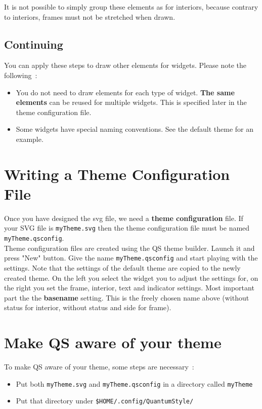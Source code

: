 \documentclass[a4paper,12pt]{report}
\begin{document}
It is not possible to simply group these elements as for interiors, because
contrary to interiors, frames must not be stretched when drawn.\\

\subsection{Continuing}
You can apply these steps to draw other elements for widgets. Please note the
following~:

\begin{itemize}
  \item You do not need to draw elements for each type of widget. \textbf{The
same elements} can be reused for multiple widgets. This is specified later in
the theme configuration file.\\

  \item Some widgets have special naming conventions. See the default theme for
an example.
\end{itemize}

\section{Writing a Theme Configuration File}
Once you have designed the svg file, we need a \textbf{theme configuration}
file. If your SVG file is \verb,myTheme.svg, then the theme configuration file
must be named \verb,myTheme.qsconfig,.\\

Theme configuration files are created using the QS theme builder. Launch it and
press "New" button. Give the name \verb,myTheme.qsconfig, and start playing
with the settings. Note that the settings of the default theme are copied to
the newly created theme. On the left you select the widget you to adjust the
settings for, on the right you set the frame, interior, text and indicator
settings. Most important part the the \textbf{basename} setting. This is the
freely chosen name above (without status for interior, without status and side
for frame).

\section{Make QS aware of your theme}
To make QS aware of your theme, some steps are necessary~:

\begin{itemize}
  \item Put both \verb,myTheme.svg, and \verb,myTheme.qsconfig, in a directory
called \verb,myTheme,
  \item Put that directory under \verb,$HOME/.config/QuantumStyle/,
\end{itemize}
\end{document}
